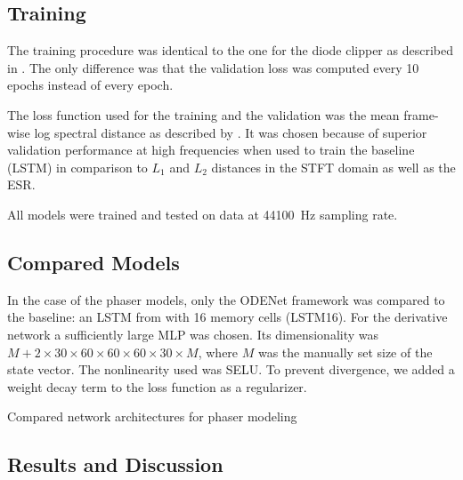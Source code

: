 \subsection{Training}
\label{sec:phaser_training}
The training procedure was identical to the one for the diode clipper as described in . The only difference was that the validation loss was computed every 10 epochs instead of every epoch.

The loss function used for the training and the validation was the mean frame-wise log spectral distance as described by 
.
It was chosen because of superior validation performance at high frequencies when used to train the baseline (\ac{LSTM}) in comparison to $L_1$ and $L_2$ distances in the \ac{STFT} domain as well as the \ac{ESR}.

All models were trained and tested on data at \SI{44100}{Hz} sampling rate.

\subsection{Compared Models}
\label{sec:phaser_models}

In the case of the phaser models, only the ODENet framework was compared to the baseline: an \ac{LSTM} from \cite{Wright2020} with 16 memory cells (\ac{LSTM}16). For the derivative network a sufficiently large \ac{MLP} was chosen. Its dimensionality was $M + 2 \times 30 \times 60 \times 60\times 60 \times 30\times M$, where $M$ was the manually set size of the state vector. The nonlinearity used was \ac{SELU}. To prevent divergence, we added a weight decay term to the loss function as a regularizer.

\begin{table}[]
    \caption{Compared network architectures for phaser modeling}
    \centering
    
    \label{tab:phaser_models_data}
\end{table}

\subsection{Results and Discussion}
\label{sec:phaser_results}

